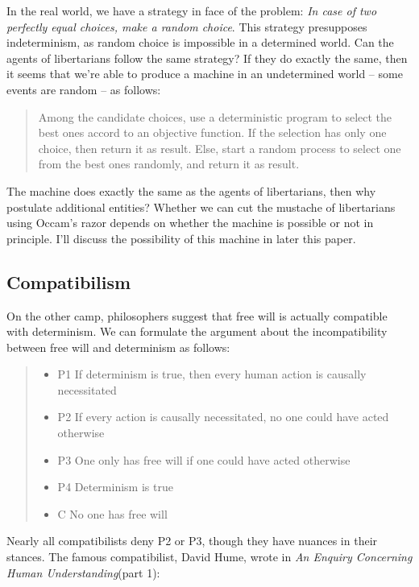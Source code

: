 In the real world, we have a strategy in face of the problem: \emph{In case of two perfectly equal choices, make a random choice}. This strategy presupposes indeterminism, as random choice is impossible in a determined world. Can the agents of libertarians follow the same strategy? If they do exactly the same, then it seems that we're able to produce a machine in an undetermined world  -- some events are random -- as follows:

\begin{quote}
Among the candidate choices, use a deterministic program to select the best ones accord to an objective function. If the selection has only one choice, then return it as result. Else, start a random process to select one from the best ones randomly, and return it as result.
\end{quote}

The machine does exactly the same as the agents of libertarians, then why postulate additional entities? Whether we can cut the mustache of libertarians using Occam's razor depends on whether the machine is possible or not in principle. I'll discuss the possibility of this machine in later this paper.
\fi

\subsection{Compatibilism}

On the other camp, philosophers suggest that free will is actually compatible with determinism. We can formulate the argument about the incompatibility between free will and determinism as follows:

\begin{quote}
  \begin{itemize}
    \item P1 If determinism is true, then every human action is causally necessitated
    \item P2 If every action is causally necessitated, no one could have acted otherwise
    \item P3 One only has free will if one could have acted otherwise
    \item P4 Determinism is true
    \item C No one has free will
  \end{itemize}
\end{quote}

Nearly all compatibilists deny P2 or P3, though they have nuances in their stances. The famous compatibilist, David Hume, wrote in \emph{An Enquiry Concerning Human Understanding}(part 1):

